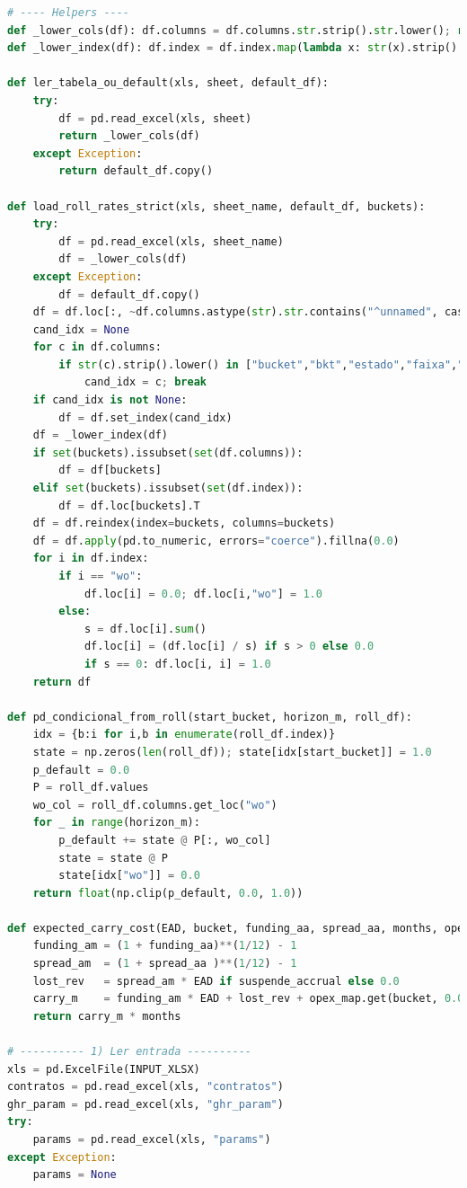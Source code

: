 \documentclass[11pt,a4paper]{article}
\newcommand{\1}{\mathbf{1}}
\begin{document}
\begin{lstlisting}[language=Python, caption={risk_frontier.py (versão completa com normalização por prazo e visões)}]
# ---- Helpers ----
def _lower_cols(df): df.columns = df.columns.str.strip().str.lower(); return df
def _lower_index(df): df.index = df.index.map(lambda x: str(x).strip().lower()); return df

def ler_tabela_ou_default(xls, sheet, default_df):
    try:
        df = pd.read_excel(xls, sheet)
        return _lower_cols(df)
    except Exception:
        return default_df.copy()

def load_roll_rates_strict(xls, sheet_name, default_df, buckets):
    try:
        df = pd.read_excel(xls, sheet_name)
        df = _lower_cols(df)
    except Exception:
        df = default_df.copy()
    df = df.loc[:, ~df.columns.astype(str).str.contains("^unnamed", case=False, regex=True)]
    cand_idx = None
    for c in df.columns:
        if str(c).strip().lower() in ["bucket","bkt","estado","faixa","bucket_atraso"]:
            cand_idx = c; break
    if cand_idx is not None:
        df = df.set_index(cand_idx)
    df = _lower_index(df)
    if set(buckets).issubset(set(df.columns)):
        df = df[buckets]
    elif set(buckets).issubset(set(df.index)):
        df = df.loc[buckets].T
    df = df.reindex(index=buckets, columns=buckets)
    df = df.apply(pd.to_numeric, errors="coerce").fillna(0.0)
    for i in df.index:
        if i == "wo":
            df.loc[i] = 0.0; df.loc[i,"wo"] = 1.0
        else:
            s = df.loc[i].sum()
            df.loc[i] = (df.loc[i] / s) if s > 0 else 0.0
            if s == 0: df.loc[i, i] = 1.0
    return df

def pd_condicional_from_roll(start_bucket, horizon_m, roll_df):
    idx = {b:i for i,b in enumerate(roll_df.index)}
    state = np.zeros(len(roll_df)); state[idx[start_bucket]] = 1.0
    p_default = 0.0
    P = roll_df.values
    wo_col = roll_df.columns.get_loc("wo")
    for _ in range(horizon_m):
        p_default += state @ P[:, wo_col]
        state = state @ P
        state[idx["wo"]] = 0.0
    return float(np.clip(p_default, 0.0, 1.0))

def expected_carry_cost(EAD, bucket, funding_aa, spread_aa, months, opex_map, suspende_accrual=True):
    funding_am = (1 + funding_aa)**(1/12) - 1
    spread_am  = (1 + spread_aa )**(1/12) - 1
    lost_rev   = spread_am * EAD if suspende_accrual else 0.0
    carry_m    = funding_am * EAD + lost_rev + opex_map.get(bucket, 0.0)
    return carry_m * months

# ---------- 1) Ler entrada ----------
xls = pd.ExcelFile(INPUT_XLSX)
contratos = pd.read_excel(xls, "contratos")
ghr_param = pd.read_excel(xls, "ghr_param")
try:
    params = pd.read_excel(xls, "params")
except Exception:
    params = None


\end{lstlisting}
\end{document}

